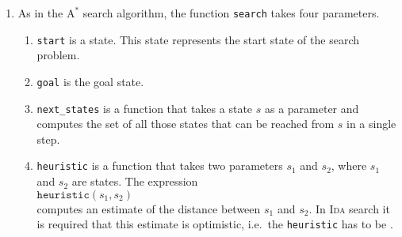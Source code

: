 \begin{enumerate}
\item As in the $\mathrm{A}^*$ search algorithm, the function \texttt{search} takes four parameters.
      \begin{enumerate}
      \item \texttt{start} is a state.  This state represents the start state of the search problem.
      \item \texttt{goal} is the goal state.
      \item \texttt{next\_states} is a function that takes a state $s$ as a parameter and
            computes the set of all those states that can be reached from $s$ in a single step.
      \item \texttt{heuristic} is a function that takes two parameters $s_1$ and $s_2$, where $s_1$ and $s_2$
            are states. The expression
            \\[0.2cm]
            \hspace*{1.3cm}
            $\texttt{heuristic}(s_1, s_2)$
            \\[0.2cm]
            computes an estimate of the distance between $s_1$ and $s_2$.  In \textsc{Ida} search it is required that this
            estimate is optimistic, i.e.~the \texttt{heuristic} has to be .


\end{enumerate}
\end{enumerate}
